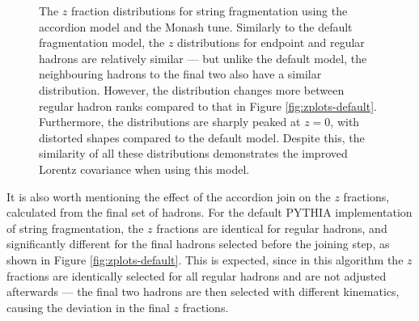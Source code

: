 \documentclass[12pt,a4paper]{report}
\begin{document}
\begin{figure}
  \centering
  \begin{minipage}[t]{0.48\linewidth}
    \centering
    
    \caption{The $z$ fraction distributions for string fragmentation using the default fragmentation model and the Monash tune. All $z$ fractions are computed from the final event based on the (saved) fragmentation order. The distribution for endpoint hadrons is quite similar to the distributions of regular hadrons, and the variance of regular hadron $z$ distributions between ranks is quite small. However, the $z$ distribution for the hadrons neighbouring the final two has a completely different shape, indicating a violation of Lorentz covariance.}
    \label{fig:zplots-default}
  \end{minipage}
  \hfill
  \begin{minipage}[t]{0.48\linewidth}
    \centering
    
    \caption{The $z$ fraction distributions for string fragmentation using the accordion model and the Monash tune. Similarly to the default fragmentation model, the $z$ distributions for endpoint and regular hadrons are relatively similar --- but unlike the default model, the neighbouring hadrons to the final two also have a similar distribution. However, the distribution changes more between regular hadron ranks compared to that in Figure \ref{fig:zplots-default}. Furthermore, the distributions are sharply peaked at $z = 0$, with distorted shapes compared to the default model. Despite this, the similarity of all these distributions demonstrates the improved Lorentz covariance when using this model.}
    \label{fig:zplots-accordion}
  \end{minipage}
\end{figure}

It is also worth mentioning the effect of the accordion join on the $z$ fractions, calculated from the final set of hadrons. For the default PYTHIA implementation of string fragmentation, the $z$ fractions are identical for regular hadrons, and significantly different for the final hadrons selected before the joining step, as shown in Figure \ref{fig:zplots-default}. This is expected, since in this algorithm the $z$ fractions are identically selected for all regular hadrons and are not adjusted afterwards --- the final two hadrons are then selected with different kinematics, causing the deviation in the final $z$ fractions.
\end{document}
